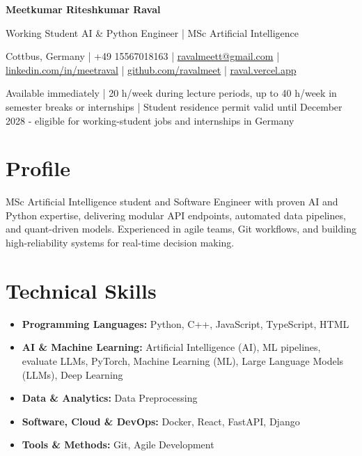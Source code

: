 \documentclass[a4paper,10pt]{article}
\begin{document}
\begin{center}
  {\LARGE\bfseries Meetkumar Riteshkumar Raval}\par\vspace{3pt}
  {\large Working Student AI \& Python Engineer | MSc Artificial Intelligence}\par\vspace{3pt}
  {\small Cottbus, Germany | +49 15567018163 | \href{mailto:ravalmeett@gmail.com}{ravalmeett@gmail.com} | \href{https://www.linkedin.com/in/meetraval/}{linkedin.com/in/meetraval} | \href{https://github.com/ravalmeet}{github.com/ravalmeet} | \href{https://raval.vercel.app/}{raval.vercel.app}}\par\vspace{2pt}
  {\small Available immediately | 20 h/week during lecture periods, up to 40 h/week in semester breaks or internships | Student residence permit valid until December 2028 - eligible for working-student jobs and internships in Germany}\par
\end{center}

\section*{Profile}
MSc Artificial Intelligence student and Software Engineer with proven AI and Python expertise, delivering modular API endpoints, automated data pipelines, and quant-driven models. Experienced in agile teams, Git workflows, and building high-reliability systems for real-time decision making.\par

\section*{Technical Skills}
\begin{itemize}
\item \textbf{Programming Languages:} Python, C++, JavaScript, TypeScript, HTML
\item \textbf{AI \& Machine Learning:} Artificial Intelligence (AI), ML pipelines, evaluate LLMs, PyTorch, Machine Learning (ML), Large Language Models (LLMs), Deep Learning
\item \textbf{Data \& Analytics:} Data Preprocessing
\item \textbf{Software, Cloud \& DevOps:} Docker, React, FastAPI, Django
\item \textbf{Tools \& Methods:} Git, Agile Development
\end{itemize}
\end{document}
